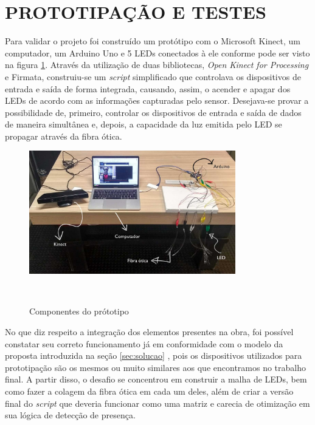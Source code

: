 \section{PROTOTIPAÇÃO E TESTES}

Para validar o projeto foi construído um protótipo com o Microsoft Kinect, um computador, um Arduino Uno e 5 LEDs conectados à ele conforme pode ser visto na figura \ref{fig:prototipo}. Através da utilização de duas bibliotecas, \textit{Open Kinect for Processing} e Firmata, construiu-se um \textit{script} simplificado que controlava os dispositivos de entrada e saída de forma integrada, causando, assim, o acender e apagar dos LEDs de acordo com as informações capturadas pelo sensor. Desejava-se provar a possibilidade de, primeiro, controlar os dispositivos de entrada e saída de dados de maneira simultânea e, depois, a capacidade da luz emitida pelo LED se propagar através da fibra ótica.

\begin{figure}[H]
  \begin{center}
    \caption{Componentes do prótotipo}
    \vspace*{0,2cm}
    \includegraphics[width=0.8\textwidth]{./04-figuras/prototipo}
    \label{fig:prototipo}
  \end{center}
  \vspace*{-0,9cm}
  \\
\end{figure}

No que diz respeito a integração dos elementos presentes na obra, foi possível constatar seu correto funcionamento já em conformidade com o modelo da proposta introduzida na seção \ref{sec:solucao} , pois os dispositivos utilizados para prototipação são os mesmos ou muito similares aos que encontramos no trabalho final. A partir disso, o desafio se concentrou em construir a malha de LEDs, bem como fazer a colagem da fibra ótica em cada um deles, além de criar a versão final do \textit{script} que deveria funcionar como uma matriz e carecia de otimização em sua lógica de detecção de presença.

